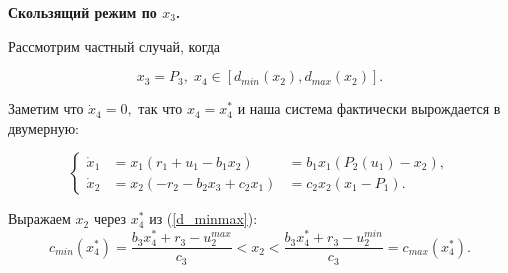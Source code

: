 \documentclass[11pt]{article}
\theoremstyle{definition}
\newcommand\Ref[1]{(\ref{#1})}
\newcommand\beq{\begin{equation}}
\newcommand\eeq{\end{equation}}
\begin{document}
%

%

{\bf Скользящий режим по $x_3$.}

Рассмотрим частный случай, когда

\beq
\label{d_minmax}
	x_3 = P_3, \; x_4 \in [d_{min}(x_2), d_{max}(x_2)].
\eeq

Заметим что $\dot x_4 = 0,$ так что $x_4 = x_4^*$ и наша система фактически вырождается в двумерную:

$$
\left\{
\begin{aligned}
	\dot x_1 &= x_1(r_1 + u_1- b_1x_2) &= b_1x_1(P_2(u_1) - x_2), \\
	\dot x_2 &= x_2(-r_2 - b_2x_3 + c_2x_1) &= c_2x_2(x_1 - P_1).
\end{aligned}
\right.
$$

Выражаем $x_2$ через $x_4^*$ из \Ref{d_minmax}:
$$c_{min}(x_4^*) = \frac{b_3x_4^* + r_3 - u_2^{max}}{c_3} < x_2 < \frac{b_3x_4^* + r_3 - u_2^{min}}{c_3} = c_{max}(x_4^*).$$
\end{document}
